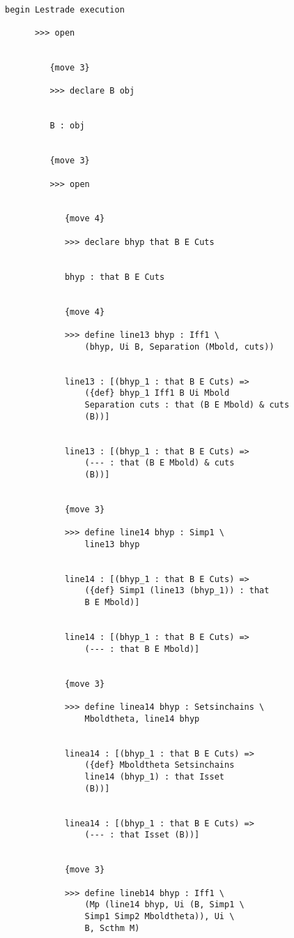\documentclass[12pt]{article}
\begin{document}
\begin{verbatim}

begin Lestrade execution

      >>> open


         {move 3}

         >>> declare B obj


         B : obj


         {move 3}

         >>> open


            {move 4}

            >>> declare bhyp that B E Cuts


            bhyp : that B E Cuts


            {move 4}

            >>> define line13 bhyp : Iff1 \
                (bhyp, Ui B, Separation (Mbold, cuts))


            line13 : [(bhyp_1 : that B E Cuts) => 
                ({def} bhyp_1 Iff1 B Ui Mbold 
                Separation cuts : that (B E Mbold) & cuts 
                (B))]


            line13 : [(bhyp_1 : that B E Cuts) => 
                (--- : that (B E Mbold) & cuts 
                (B))]


            {move 3}

            >>> define line14 bhyp : Simp1 \
                line13 bhyp


            line14 : [(bhyp_1 : that B E Cuts) => 
                ({def} Simp1 (line13 (bhyp_1)) : that 
                B E Mbold)]


            line14 : [(bhyp_1 : that B E Cuts) => 
                (--- : that B E Mbold)]


            {move 3}

            >>> define linea14 bhyp : Setsinchains \
                Mboldtheta, line14 bhyp


            linea14 : [(bhyp_1 : that B E Cuts) => 
                ({def} Mboldtheta Setsinchains 
                line14 (bhyp_1) : that Isset 
                (B))]


            linea14 : [(bhyp_1 : that B E Cuts) => 
                (--- : that Isset (B))]


            {move 3}

            >>> define lineb14 bhyp : Iff1 \
                (Mp (line14 bhyp, Ui (B, Simp1 \
                Simp1 Simp2 Mboldtheta)), Ui \
                B, Scthm M)



\end{verbatim}
\end{document}
